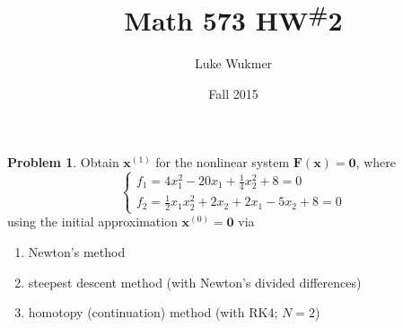 \documentclass[10pt]{article}
\theoremstyle{plain}
\theoremstyle{definition}
\newtheorem{prob}{Problem}
\numberwithin{equation}{section}
\begin{document}
\title{Math 573 HW\textsuperscript{\#}2}
\author{Luke Wukmer}
\date{Fall 2015}
\maketitle \thispagestyle{empty} %

%

\begin{prob}

    Obtain $\bm{x}^{(1)}$ for the nonlinear system $\bm{F}(\bm{x}) = \bm{0}$, where
    \[
            \begin{cases}
                f_1 = 4x_1^2 - 20x_1+\frac{1}{4}x_2^2 + 8 = 0 \\
                f_2 = \frac{1}{2} x_1 x_2^2 + 2x_2 + 2x_1 - 5x_2 + 8 = 0
            \end{cases}
        \]
        using the initial approximation $\bm{x}^{(0)} = \bm{0}$ via
        \begin{enumerate}[\bfseries(a)]
            \item Newton's method
            \item steepest descent method (with Newton's divided differences)
            \item homotopy (continuation) method (with RK4; $N = 2$)
        \end{enumerate}
\end{prob}
\end{document}

